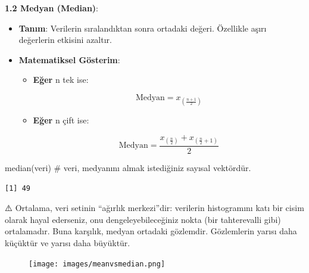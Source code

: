 \documentclass[
  letterpaper,
  DIV=11,
  numbers=noendperiod]{scrartcl}
\newenvironment{Shaded}{\begin{snugshade}}{\end{snugshade}}
\newcommand{\CommentTok}[1]{\textcolor[rgb]{0.37,0.37,0.37}{#1}}
\newcommand{\FunctionTok}[1]{\textcolor[rgb]{0.28,0.35,0.67}{#1}}
\newcommand{\NormalTok}[1]{\textcolor[rgb]{0.00,0.23,0.31}{#1}}
\providecommand{\tightlist}{%
  \setlength{\itemsep}{0pt}\setlength{\parskip}{0pt}}\usepackage{longtable,booktabs,array}
\begin{document}
\textbf{1.2 Medyan (Median)}:

\begin{itemize}
\tightlist
\item
  \textbf{Tanım}: Verilerin sıralandıktan sonra ortadaki değeri.
  Özellikle aşırı değerlerin etkisini azaltır.
\item
  \textbf{Matematiksel Gösterim}:

  \begin{itemize}
  \item
    \textbf{Eğer} n tek ise:

    \[
    \text{Medyan} = x_{\left(\frac{n+1}{2}\right)}
    \]
  \item
    \textbf{Eğer} n çift ise:

    \[
    \text{Medyan} = \frac{x_{\left(\frac{n}{2}\right)} + x_{\left(\frac{n}{2}+1\right)}}{2}
    \]
  \end{itemize}
\end{itemize}

\begin{Shaded}
\begin{Highlighting}[]
\FunctionTok{median}\NormalTok{(veri)  }\CommentTok{\# veri, medyanını almak istediğiniz sayısal vektördür.}
\end{Highlighting}
\end{Shaded}

\begin{verbatim}
[1] 49
\end{verbatim}

\begin{tcolorbox}[enhanced jigsaw, bottomrule=.15mm, opacitybacktitle=0.6, rightrule=.15mm, left=2mm, toprule=.15mm, leftrule=.75mm, titlerule=0mm, colframe=quarto-callout-note-color-frame, opacityback=0, arc=.35mm, colbacktitle=quarto-callout-note-color!10!white, title=\textcolor{quarto-callout-note-color}{\faInfo}\hspace{0.5em}{Not}, coltitle=black, breakable, bottomtitle=1mm, toptitle=1mm, colback=white]

⚠️ Ortalama, veri setinin ``ağırlık merkezi''dir: verilerin histogramını
katı bir cisim olarak hayal ederseniz, onu dengeleyebileceğiniz nokta
(bir tahterevalli gibi) ortalamadır. Buna karşılık, medyan ortadaki
gözlemdir. Gözlemlerin yarısı daha küçüktür ve yarısı daha büyüktür.

\end{tcolorbox}

\begin{figure}

{\centering \texttt{[image: images/meanvsmedian.png]}

}

\end{figure}
\end{document}
